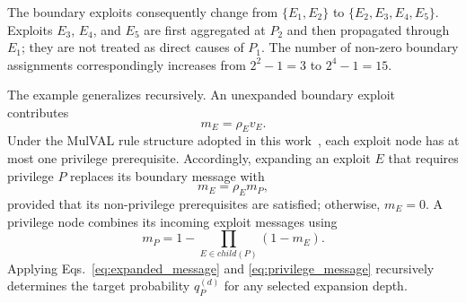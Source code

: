 \documentclass[conference]{IEEEtran}
\theoremstyle{definition} %
\theoremstyle{plain} %
\begin{document}
The boundary exploits consequently change from $\{E_1,E_2\}$ to $\{E_2,E_3,E_4,E_5\}$. Exploits $E_3$, $E_4$, and $E_5$ are first aggregated at $P_2$ and then propagated through $E_1$; they are not treated as direct causes of $P_1$. The number of non-zero boundary assignments correspondingly increases from $2^2-1=3$ to $2^4-1=15$.

The example generalizes recursively. An unexpanded boundary exploit contributes
\begin{equation}
m_E=\rho_Ev_E.
\label{eq:boundary_message}
\end{equation}
Under the MulVAL rule structure adopted in this work~\cite{ou2005mulval,ou2006scalable}, each exploit node has at most one privilege prerequisite. Accordingly, expanding an exploit $E$ that requires privilege $P$ replaces its boundary message with
\begin{equation}
m_E=\rho_Em_P,
\label{eq:expanded_message}
\end{equation}
provided that its non-privilege prerequisites are satisfied; otherwise, $m_E=0$. A privilege node combines its incoming exploit messages using
\begin{equation}
m_P
=
1-\prod_{E\in child(P)}(1-m_E).
\label{eq:privilege_message}
\end{equation}
Applying Eqs.~\eqref{eq:expanded_message} and \eqref{eq:privilege_message} recursively determines the target probability $q_P^{(d)}$ for any selected expansion depth.
\end{document}
